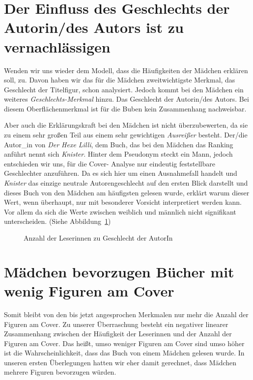 \section{Der Einfluss des Geschlechts der Autorin/des Autors ist zu
vernachlässigen}

Wenden wir uns wieder dem Modell, dass die Häufigkeiten der Mädchen
erklären soll, zu. Davon haben wir das für die Mädchen zweitwichtigste
Merkmal, das Geschlecht der Titelfigur, schon analysiert. Jedoch kommt
bei den Mädchen ein weiteres \emph{Geschlechts-Merkmal} hinzu. Das
Geschlecht der Autorin/des Autors. Bei diesem Oberflächenmerkmal ist für
die Buben kein Zusammenhang nachweisbar.

Aber auch die Erklärungskraft bei den Mädchen ist nicht überzubewerten,
da sie zu einem sehr großen Teil aus einem sehr gewichtigen
\emph{Ausreißer} besteht. Der/die Autor\_in von \emph{Der Hexe Lilli},
dem Buch, das bei den Mädchen das Ranking anführt nennt sich
\emph{Knister}. Hinter dem Pseudonym steckt ein Mann, jedoch entschieden
wir uns, für die Cover- Analyse nur eindeutig feststellbare Geschlechter
anzuführen. Da es sich hier um einen Ausnahmefall handelt und
\emph{Knister} das einzige neutrale Autorengeschlecht auf den ersten
Blick darstellt und dieses Buch von den Mädchen am häufigsten gelesen
wurde, erklärt warum dieser Wert, wenn überhaupt, nur mit besonderer
Vorsicht interpretiert werden kann. Vor allem da sich die Werte zwischen
weiblich und männlich nicht signifikant unterscheiden. (Siehe
Abbildung~\ref{maedchen-geschlecht})

\begin{figure}
\center
  \caption[Leserinnen--Geschlecht]{Anzahl der Leserinnen zu Geschlecht der AutorIn}
  \label{maedchen-geschlecht}


\end{figure}

\section{Mädchen bevorzugen Bücher mit wenig Figuren am Cover}

Somit bleibt von den bis jetzt angesprochen Merkmalen nur mehr die
Anzahl der Figuren am Cover. Zu unserer Überraschung besteht ein
negativer linearer Zusammenhang zwischen der Häufigkeit der Leserinnen
und der Anzahl der Figuren am Cover. Das heißt, umso weniger Figuren am
Cover sind umso höher ist die Wahrscheinlichkeit, dass das Buch von
einem Mädchen gelesen wurde. In unseren ersten Überlegungen hatten wir
eher damit gerechnet, dass Mädchen mehrere Figuren bevorzugen würden.

